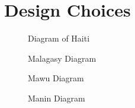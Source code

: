 
%
%

\chapter{Design Choices}
\label{chap:design_choices}


\begin{figure}[ht]
	\small
	\centering
	
	\label{fig:ht_tikz}
	\caption{Diagram of Haiti}
\end{figure}


\begin{figure}[ht]
	\small
	\centering
	
	\label{fig:mlg_tikz}
	\caption{Malagasy Diagram}
\end{figure}


\begin{figure}[ht]
	\small
	\centering
	
	\label{fig:mawu_tikz}
	\caption{Mawu Diagram}
\end{figure}

\begin{figure}[ht]
	\small
	\centering
	
	\label{fig:manin_tikz}
	\caption{Manin Diagram}
\end{figure}

